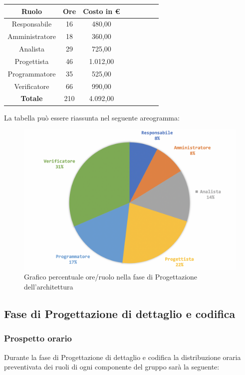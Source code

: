 		\begin{longtable}{|c|c|c|c|c|c|c|c}
			\hline
			\rowcolor{lighter-grayer}
			\textbf{Ruolo} & \textbf{Ore} & \textbf{Costo in € } \\
			\hline
			\endfirsthead
			
			\hline
			Responsabile 	    & 16 & 480,00\\
			\hline 
			\hline
			Amministratore	  & 18 & 360,00\\
			\hline
			\hline
			Analista 				& 29 & 725,00\\
			\hline
			\hline
			Progettista 		  & 46 & 1.012,00\\
			\hline
			\hline
			Programmatore 	 & 35 & 525,00\\
			\hline
			\hline
			Verificatore 		  & 66 & 990,00\\
			\hline
			\textbf{Totale} 	& 210 & 4.092,00\\
			\hline
			
		\end{longtable}
		\pagebreak
		
		La tabella può essere riassunta nel seguente areogramma:
		\begin{figure}[H]
			\centering
			\includegraphics[width=0.8\linewidth]{./images/progArch2.png}
			\caption{Grafico percentuale ore/ruolo nella fase di Progettazione dell'architettura}
			\label{fig:grafico costi ruolo fase Progettazione archittetura}
		\end{figure}
	
		\subsection{Fase di Progettazione di dettaglio e codifica}
		\subsubsection{Prospetto orario}
		Durante la fase di Progettazione di dettaglio e codifica la distribuzione oraria preventivata dei ruoli di ogni componente del gruppo sarà la seguente:
		
